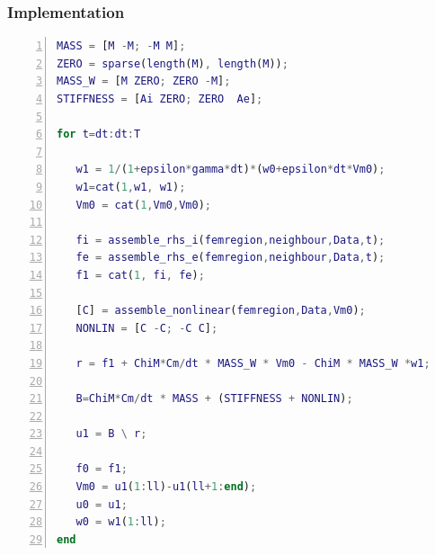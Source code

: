 \documentclass[a4paper,11pt]{article}
\begin{document}
\subsubsection{Implementation}
\begin{lstlisting}[language=Matlab,basicstyle=\small, numbers=left, numberstyle=\tiny,  name = main2D.m (semi-implicit), frame=single]
MASS = [M -M; -M M];
ZERO = sparse(length(M), length(M));
MASS_W = [M ZERO; ZERO -M];
STIFFNESS = [Ai ZERO; ZERO  Ae];

for t=dt:dt:T

   w1 = 1/(1+epsilon*gamma*dt)*(w0+epsilon*dt*Vm0);
   w1=cat(1,w1, w1);
   Vm0 = cat(1,Vm0,Vm0);

   fi = assemble_rhs_i(femregion,neighbour,Data,t);
   fe = assemble_rhs_e(femregion,neighbour,Data,t);
   f1 = cat(1, fi, fe);

   [C] = assemble_nonlinear(femregion,Data,Vm0);
   NONLIN = [C -C; -C C];

   r = f1 + ChiM*Cm/dt * MASS_W * Vm0 - ChiM * MASS_W *w1;

   B=ChiM*Cm/dt * MASS + (STIFFNESS + NONLIN);

   u1 = B \ r;

   f0 = f1;
   Vm0 = u1(1:ll)-u1(ll+1:end);
   u0 = u1;
   w0 = w1(1:ll);
end
\end{lstlisting}
\vspace{4mm}
\end{document}
